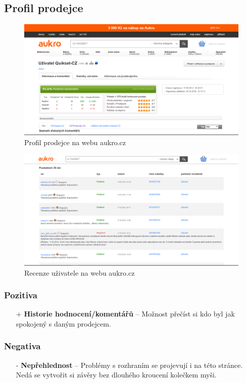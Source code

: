 \newpage
\subsection{Profil prodejce}
\begin{figure}[h]
    \centering
    \includegraphics[width=1.0\textwidth]{media/aukro/profile.png}
    \caption{Profil prodejce na webu aukro.cz}
    \label{fig:aukro:profile}
\end{figure}
\begin{figure}[h]
    \centering
    \includegraphics[width=1.0\textwidth]{media/aukro/profile2.png}
    \caption{Recenze uživatele na webu aukro.cz}
    \label{fig:aukro:profile2}
\end{figure}
\subsubsection*{Pozitiva}
\begin{itemize}
    \item[+] \textbf{Historie hodnocení/komentářů} -- Možnost přečíst si kdo byl jak spokojený s daným prodejcem.
\end{itemize}
\subsubsection*{Negativa}
\begin{itemize}
    \item[-] \textbf{Nepřehlednost} -- Problémy s rozhraním se projevují i na této stránce. Nedá se vytvořit si závěry bez dlouhého kroucení kolečkem myši.
\end{itemize}


